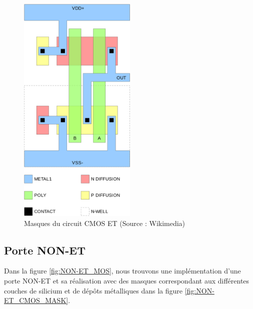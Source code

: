 \documentclass[a4paper,11pt]{book}
\theoremstyle{definition}
\begin{document}
\begin{figure}
\centering
\includegraphics[width=0.5\textwidth]{media/ImplementationGates/800px-CMOS_AND_Silicon.svg.png}
\caption{Masques du circuit CMOS ET (Source : Wikimedia)}
\label{fig:ET_CMOS_MASK}
\end{figure}


\subsection{Porte NON-ET}
Dans la figure \ref{fig:NON-ET_MOS}, nous trouvons une implémentation d'une porte NON-ET et sa réalisation avec des masques correspondant aux différentes couches de silicium et de dépôts métalliques dans la figure \ref{fig:NON-ET_CMOS_MASK}.
\end{document}

